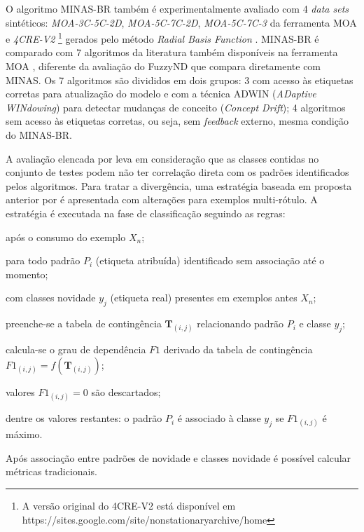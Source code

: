 O algoritmo MINAS-BR também é experimentalmente avaliado com 4 \emph{data sets} sintéticos:
\emph{MOA-3C-5C-2D}, \emph{MOA-5C-7C-2D}, \emph{MOA-5C-7C-3} da ferramenta  MOA \cite{MOA}
e \emph{4CRE-V2}
\footnote{A versão original do \dataset 4CRE-V2 está disponível em https://sites.google.com/site/nonstationaryarchive/home}
gerados pelo método \emph{Radial Basis Function} \cite{souza2015}.
MINAS-BR é comparado com 7 algoritmos da literatura também disponíveis na ferramenta
MOA \cite{MOA},
diferente da avaliação do FuzzyND que compara diretamente com MINAS.
Os 7 algoritmos são divididos em dois grupos: 3 com acesso às etiquetas corretas para
atualização do modelo e com a técnica ADWIN (\emph{ADaptive WINdowing}) para detectar
mudanças de conceito (\emph{Concept Drift}); 4 algoritmos sem acesso às etiquetas corretas,
ou seja, sem \emph{feedback} externo, mesma condição do MINAS-BR.


A avaliação elencada por  leva em consideração que as classes
contidas no conjunto de testes podem não ter correlação direta com os padrões identificados
pelos algoritmos.
Para tratar a divergência, uma estratégia baseada em proposta anterior por
 é apresentada com alterações para exemplos multi-rótulo.
A estratégia é executada na fase de classificação seguindo as regras:
\begin{enumerate*}
    \item após o consumo do exemplo $X_n$;
    \item para todo padrão $P_i$ (etiqueta atribuída) identificado sem associação até o momento;
    \item com classes novidade $y_j$ (etiqueta real) presentes em exemplos antes $X_n$;
    \item preenche-se a tabela de contingência $\mathbf{T}_{(i,j)}$ relacionando padrão $P_i$ e classe $y_j$;
    \item calcula-se o grau de dependência $\mathit{F1}$ derivado da tabela de contingência
    $\mathit{F1}_{(i,j)} = f(\mathbf{T}_{(i,j)})$;
    \item valores $\mathit{F1}_{(i,j)} = 0$ são descartados;
    \item dentre os valores restantes: o padrão $P_i$ é associado à classe $y_j$
    se $\mathit{F1}_{(i,j)}$ é máximo.
\end{enumerate*}
Após associação entre padrões de novidade e classes novidade é possível calcular métricas tradicionais.

